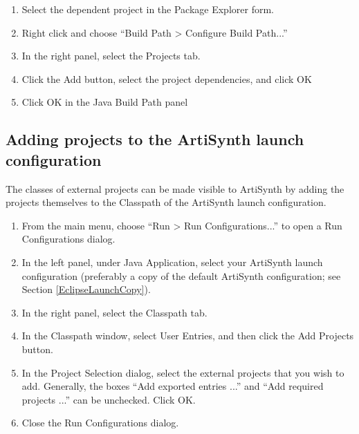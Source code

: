\begin{enumerate}

\item Select the dependent project in the {\sf Package Explorer} form.

\item Right click and choose ``{\sf Build Path > Configure Build Path...}''

\item In the right panel, select the {\sf Projects} tab.

\item Click the {\sf Add} button, select the project dependencies,
      and click {\sf OK}

\item Click {\sf OK} in the Java Build Path panel

\end{enumerate}

\subsection{Adding projects to the ArtiSynth launch configuration}
\label{AddingProjectsToLaunch}

The classes of external projects can be made visible to ArtiSynth by
adding the projects themselves to the Classpath of the ArtiSynth launch
configuration.

\begin{enumerate}

\item From the main menu, choose ``{\sf Run > Run Configurations...}''
to open a {\sf Run Configurations} dialog.

\item In the left panel, under {\sf Java Application}, select your
ArtiSynth launch configuration (preferably a copy of the default {\sf
ArtiSynth} configuration; see Section \ref{EclipseLaunchCopy}).

\item In the right panel, select the {\sf Classpath} tab.

\item In the {\sf Classpath} window, select {\sf User Entries},
and then click the {\sf Add Projects} button.

\item In the {\sf Project Selection} dialog, select the external
projects that you wish to add. Generally, the boxes
``{\sf Add exported entries ...}'' and ``{\sf Add required projects ...}''
can be unchecked. Click {\sf OK}.

\item Close the {\sf Run Configurations} dialog.

\end{enumerate}

